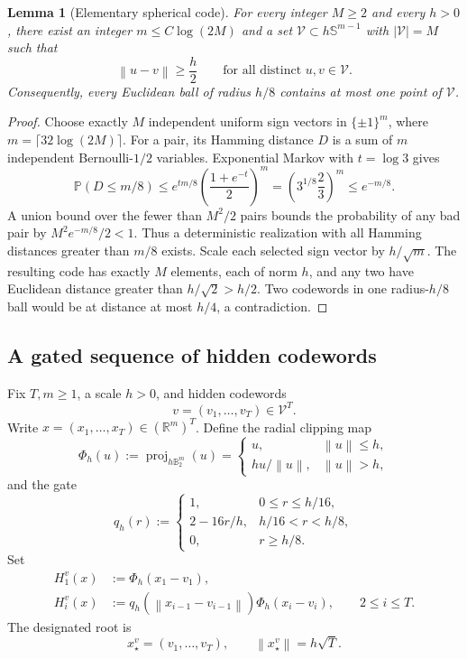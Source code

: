\documentclass[11pt,a4paper]{article}
\newcommand{\R}{\mathbb R}
\newcommand{\Pp}{\mathbb P}
\newcommand{\norm}[1]{\left\lVert #1\right\rVert}
\newcommand{\cV}{\mathcal V}
\DeclareMathOperator{\proj}{proj}
\newtheorem{lemma}[theorem]{Lemma}
\theoremstyle{definition}
\theoremstyle{remark}
\begin{document}
\begin{lemma}[Elementary spherical code]\label{lem:code}
For every integer $M\ge2$ and every $h>0$, there exist an integer $m\le C\log(2M)$ and a set $\cV\subset h\mathbb S^{m-1}$ with $|\cV|=M$ such that
\[
 \norm{u-v}\ge\frac h2
 \qquad\text{for all distinct }u,v\in\cV.
\]
Consequently, every Euclidean ball of radius $h/8$ contains at most one point of $\cV$.
\end{lemma}

\begin{proof}
Choose exactly $M$ independent uniform sign vectors in $\{\pm1\}^m$, where $m=\lceil32\log(2M)\rceil$. For a pair, its Hamming distance $D$ is a sum of $m$ independent Bernoulli-$1/2$ variables. Exponential Markov with $t=\log3$ gives
\[
 \Pp(D\le m/8)\le e^{tm/8}\left(\frac{1+e^{-t}}2\right)^m
 =\left(3^{1/8}\frac23\right)^m\le e^{-m/8}.
\]
A union bound over the fewer than $M^2/2$ pairs bounds the probability of any bad pair by $M^2e^{-m/8}/2<1$. Thus a deterministic realization with all Hamming distances greater than $m/8$ exists. Scale each selected sign vector by $h/\sqrt m$. The resulting code has exactly $M$ elements, each of norm $h$, and any two have Euclidean distance greater than $h/\sqrt2>h/2$. Two codewords in one radius-$h/8$ ball would be at distance at most $h/4$, a contradiction.
\end{proof}

\subsection{A gated sequence of hidden codewords}

Fix $T,m\ge1$, a scale $h>0$, and hidden codewords
\[
 v=(v_1,\ldots,v_T)\in\cV^T.
\]
Write $x=(x_1,\ldots,x_T)\in(\R^m)^T$.  Define the radial clipping map
\begin{equation}
 \Phi_h(u):=\proj_{h\mathbb B_2^m}(u)
 =\begin{cases}
 u,&\norm u\le h,\\
 h u/\norm u,&\norm u>h,
 \end{cases}
 \label{eq:clip}
\end{equation}
and the gate
\begin{equation}
 q_h(r):=
 \begin{cases}
 1,&0\le r\le h/16,\\
 2-16r/h,&h/16<r<h/8,\\
 0,&r\ge h/8.
 \end{cases}
 \label{eq:gate}
\end{equation}
Set
\begin{align}
 H_1^v(x)&:=\Phi_h(x_1-v_1),\label{eq:H1}\\
 H_i^v(x)&:=q_h(\norm{x_{i-1}-v_{i-1}})\Phi_h(x_i-v_i),
 \qquad 2\le i\le T.\label{eq:Hi}
\end{align}
The designated root is
\begin{equation}
 x_\star^v=(v_1,\ldots,v_T),
 \qquad \norm{x_\star^v}=h\sqrt T.
 \label{eq:root}
\end{equation}
\end{document}

